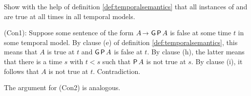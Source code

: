 \begin{exercise}
  Show with the help of definition \ref{def:temporalsemantics} that all
  instances of  and  are true at all times in all temporal
  models. %
\end{exercise}
\begin{solution}
  (Con1): Suppose some sentence of the form $A \to \tG\tP A$ is false at some time $t$ in some temporal model. By clause (e) of definition \ref{def:temporalsemantics}, this means that $A$ is true at $t$ and $\operatorname{\mathsf{G}}\operatorname{\mathsf{P}} A$ is false at $t$. By clause (h), the latter means that there is a time $s$ with $t<s$ such that $\operatorname{\mathsf{P}} A$ is not true at $s$. By clause (i), it follows that $A$ is not true at $t$. Contradiction.

  The argument for (Con2) is analogous.
\end{solution}


